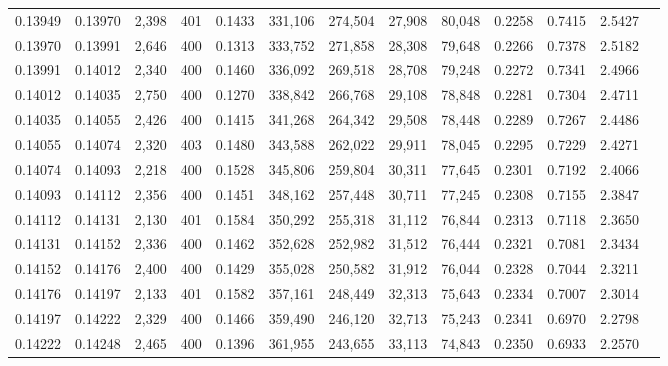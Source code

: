 \begin{tabular}{rrrrrrrrrrrrr}
0.13949 & 0.13970 &  2,398 &   401 &                                     0.1433 & 331,106 & 274,504 &  27,908 &  80,048 & 0.2258 & 0.7415 & 2.5427 \\
0.13970 & 0.13991 &  2,646 &   400 &                                     0.1313 & 333,752 & 271,858 &  28,308 &  79,648 & 0.2266 & 0.7378 & 2.5182 \\
0.13991 & 0.14012 &  2,340 &   400 &                                     0.1460 & 336,092 & 269,518 &  28,708 &  79,248 & 0.2272 & 0.7341 & 2.4966 \\
0.14012 & 0.14035 &  2,750 &   400 &                                     0.1270 & 338,842 & 266,768 &  29,108 &  78,848 & 0.2281 & 0.7304 & 2.4711 \\
0.14035 & 0.14055 &  2,426 &   400 &                                     0.1415 & 341,268 & 264,342 &  29,508 &  78,448 & 0.2289 & 0.7267 & 2.4486 \\
0.14055 & 0.14074 &  2,320 &   403 &                                     0.1480 & 343,588 & 262,022 &  29,911 &  78,045 & 0.2295 & 0.7229 & 2.4271 \\
0.14074 & 0.14093 &  2,218 &   400 &                                     0.1528 & 345,806 & 259,804 &  30,311 &  77,645 & 0.2301 & 0.7192 & 2.4066 \\
0.14093 & 0.14112 &  2,356 &   400 &                                     0.1451 & 348,162 & 257,448 &  30,711 &  77,245 & 0.2308 & 0.7155 & 2.3847 \\
0.14112 & 0.14131 &  2,130 &   401 &                                     0.1584 & 350,292 & 255,318 &  31,112 &  76,844 & 0.2313 & 0.7118 & 2.3650 \\
0.14131 & 0.14152 &  2,336 &   400 &                                     0.1462 & 352,628 & 252,982 &  31,512 &  76,444 & 0.2321 & 0.7081 & 2.3434 \\
0.14152 & 0.14176 &  2,400 &   400 &                                     0.1429 & 355,028 & 250,582 &  31,912 &  76,044 & 0.2328 & 0.7044 & 2.3211 \\
0.14176 & 0.14197 &  2,133 &   401 &                                     0.1582 & 357,161 & 248,449 &  32,313 &  75,643 & 0.2334 & 0.7007 & 2.3014 \\
0.14197 & 0.14222 &  2,329 &   400 &                                     0.1466 & 359,490 & 246,120 &  32,713 &  75,243 & 0.2341 & 0.6970 & 2.2798 \\
0.14222 & 0.14248 &  2,465 &   400 &                                     0.1396 & 361,955 & 243,655 &  33,113 &  74,843 & 0.2350 & 0.6933 & 2.2570 \\

\end{tabular}
